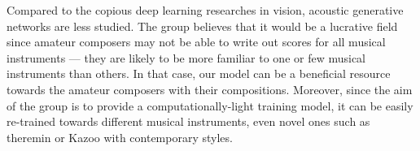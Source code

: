 \begin{par}
    \par \hspace{15pt} Compared to the copious deep learning researches in vision, acoustic generative networks are less studied. The group believes that it would be a lucrative field since amateur composers may not be able to write out scores for all musical instruments --- they are likely to be more familiar to one or few musical instruments than others. In that case, our model can be a beneficial resource towards the amateur composers with their compositions. Moreover, since the aim of the group is to provide a computationally-light training model, it can be easily re-trained towards different musical instruments, even novel ones such as theremin or Kazoo with contemporary styles. 
    

\end{par}